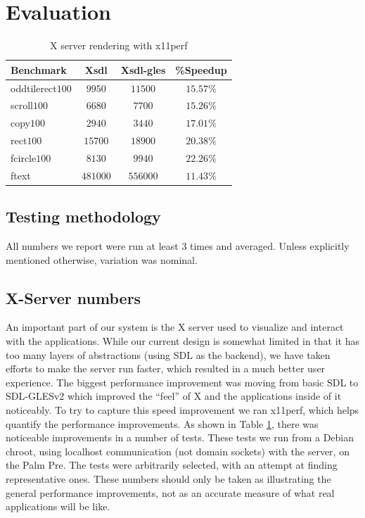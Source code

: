 \section{Evaluation}
\label{sec:eval}

\begin{table}[ht]
{\small
\hfill{}
\begin{tabular}{|l|c|c|c|}
\hline Benchmark & Xsdl & Xsdl-gles & \%Speedup \\ [2pt] 
\hline oddtilerect$100$ & $9950$ & $11500$ & $15.57\%$ \\ [2pt]
scroll$100$ & $6680$ & $7700$ & $15.26\%$ \\ [2pt]
copy$100$ & $2940$ & $3440$ & $17.01\%$ \\ [2pt]
rect$100$ & $15700$ & $18900$ & $20.38\%$ \\ [2pt]
fcircle$100$ & $8130$ & $9940$ & $22.26\%$ \\ [2pt]
ftext & $481000$ & $556000$ & $11.43\%$ \\ [2pt]
\hline 
\end{tabular}}
\hfill{}
\caption{ X server rendering with x11perf }
\label{tab:x_results}
\end{table}

\subsection{Testing methodology}

All numbers we report were run at least 3 times and averaged.  Unless explicitly mentioned otherwise, variation was nominal.

\subsection{X-Server numbers}
\label{sec:x_eval}

An important part of our system is the X server used to visualize and interact with the applications.  While our current design is somewhat limited in that it has too many layers of abstractions (using SDL as the backend), we have taken efforts to make the server run faster, which resulted in a much better user experience.  The biggest  performance improvement was moving from basic SDL to SDL-GLESv2 which improved the ``feel'' of X and the applications inside of it noticeably.  To try to capture this speed improvement we ran x11perf, which helps quantify the performance improvements.  As shown in Table \ref{tab:x_results}, there was noticeable improvements in a number of tests.
These tests we run from a Debian chroot, using localhost communication (not domain sockets) with the server, on the Palm Pre.  The tests were arbitrarily selected, with an attempt at finding representative ones.  These numbers should only be taken as illustrating the general performance improvements, not as an accurate measure of what real applications will be like.

